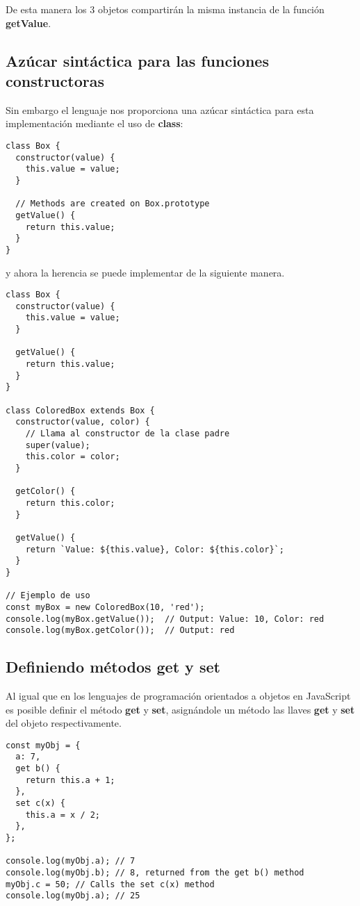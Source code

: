 \documentclass{article}
\begin{document}
De esta manera los 3 objetos compartirán la misma instancia de la función \textbf{getValue}.

\subsection*{Azúcar sintáctica para las funciones constructoras}

Sin embargo el lenguaje nos proporciona una azúcar sintáctica para esta implementación mediante
el uso de \textbf{class}:

\begin{lstlisting}
class Box {
  constructor(value) {
    this.value = value;
  }

  // Methods are created on Box.prototype
  getValue() {
    return this.value;
  }
}
\end{lstlisting}

y ahora la herencia se puede implementar de la siguiente manera.

\begin{lstlisting}
class Box {
  constructor(value) {
    this.value = value;
  }

  getValue() {
    return this.value;
  }
}

class ColoredBox extends Box {
  constructor(value, color) {
    // Llama al constructor de la clase padre
    super(value);
    this.color = color;
  }

  getColor() {
    return this.color;
  }

  getValue() {
    return `Value: ${this.value}, Color: ${this.color}`;
  }
}

// Ejemplo de uso
const myBox = new ColoredBox(10, 'red');
console.log(myBox.getValue());  // Output: Value: 10, Color: red
console.log(myBox.getColor());  // Output: red

\end{lstlisting}

\subsection*{Definiendo métodos get y set}

Al igual que en los lenguajes de programación orientados a objetos en JavaScript es posible definir
el método \textbf{get} y \textbf{set}, asignándole un método las llaves \textbf{get} y \textbf{set}
del objeto respectivamente.

\begin{lstlisting}
const myObj = {
  a: 7,
  get b() {
    return this.a + 1;
  },
  set c(x) {
    this.a = x / 2;
  },
};

console.log(myObj.a); // 7
console.log(myObj.b); // 8, returned from the get b() method
myObj.c = 50; // Calls the set c(x) method
console.log(myObj.a); // 25
\end{lstlisting}
\end{document}
